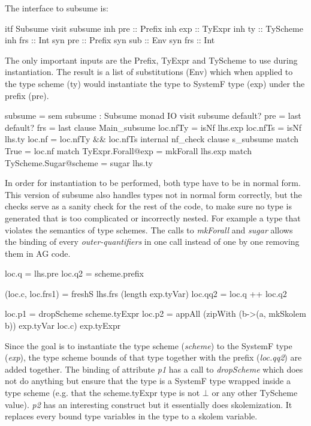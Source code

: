 The interface to subsume is:
\begin{code}
itf Subsume
  visit subsume
    inh pre  :: Prefix
    inh exp  :: TyExpr
    inh ty   :: TyScheme
    inh frs  :: Int
    syn pre  :: Prefix
    syn sub  :: Env
    syn frs  :: Int
\end{code}
The only important inputs are the Prefix, TyExpr and TyScheme to use during instantiation. The result is a list of substitutions (Env) which when applied to the type scheme (ty) would instantiate the type to SystemF type (exp) under the  prefix (pre).


\begin{code}
subsume = sem subsume : Subsume monad IO 
             visit subsume
               default? pre = last
               default? frs = last
               clause Main_subsume
                loc.nfTy = isNf lhs.exp
                loc.nfTs = isNf lhs.ty
                loc.nf   = loc.nfTy && loc.nfTs
                internal nf_check
                    clause s_subsume
                      match True                  = loc.nf
                      match TyExpr.Forall@exp     = mkForall lhs.exp
                      match TyScheme.Sugar@scheme = sugar lhs.ty
\end{code}
In order for instantiation to be performed, both type have to be in normal form. This version of subsume also handles types not in normal form correctly, but the checks serve as a sanity check for the rest of the code, to make sure no type is  generated that is too complicated or incorrectly nested. For example a type that violates the semantics of type schemes.
The calls to \emph{mkForall} and \emph{sugar} allows the binding of every \emph{outer-quantifiers} in one call instead of one by one removing them in AG code.

\begin{code}
loc.q  = lhs.pre
loc.q2 = scheme.prefix

(loc.c, loc.frs1) = freshS lhs.frs (length exp.tyVar)
loc.qq2 = loc.q ++ loc.q2

loc.p1 = dropScheme scheme.tyExpr
loc.p2 = appAll (zipWith (\a b->(a, mkSkolem b)) exp.tyVar loc.c) exp.tyExpr
\end{code}
Since the goal is to instantiate the type scheme (\emph{scheme}) to the SystemF type (\emph{exp}), the type scheme bounds of that type together with the prefix (\emph{loc.qq2}) are added together. 
The binding of attribute \emph{p1} has a call to \emph{dropScheme} which does not do anything but ensure that the type is a SystemF type wrapped inside a type scheme (e.g. that the scheme.tyExpr type is not $\bot$ or any other TyScheme value). \emph{p2} has an interesting construct but it essentially does skolemization. It replaces every bound type variables in the type to a skolem variable.

